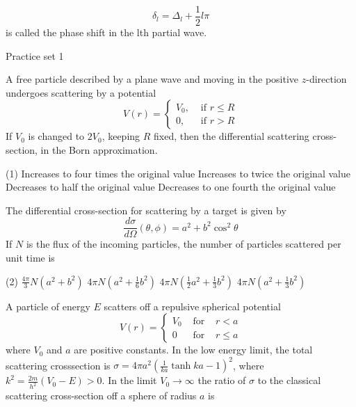  $$
 \delta_{l}=\Delta_{l}+\frac{1}{2} l \pi
 $$
 is called the phase shift in the lth partial wave.
 \newpage
 \begin{abox}
 	Practice set 1
 	\end{abox}
 \begin{enumerate}
 	\begin{minipage}{\textwidth}
 	\item A free particle described by a plane wave and moving in the positive $z$-direction undergoes scattering by a potential
 	$$
 	V(r)= \begin{cases}V_{0}, & \text { if } r \leq R \\ 0, & \text { if } r>R\end{cases}
 	$$
 	If $V_{0}$ is changed to $2 V_{0}$, keeping $R$ fixed, then the differential scattering cross-section, in the Born approximation.
 \end{minipage}
 \begin{tasks}(1)
 	\task[\textbf{A.}]Increases to four times the original value
 	\task[\textbf{B.}]Increases to twice the original value
 	\task[\textbf{C.}]Decreases to half the original value
 	\task[\textbf{D.}]Decreases to one fourth the original value
 \end{tasks}
\begin{minipage}{\textwidth}
	\item The differential cross-section for scattering by a target is given by
	$$
	\frac{d \sigma}{d \Omega}(\theta, \phi)=a^{2}+b^{2} \cos ^{2} \theta
	$$
	If $N$ is the flux of the incoming particles, the number of particles scattered per unit time is
\end{minipage}
\begin{tasks}(2)
	\task[\textbf{A.}] $\frac{4 \pi}{3} N\left(a^{2}+b^{2}\right)$
	\task[\textbf{B.}]$4 \pi N\left(a^{2}+\frac{1}{6} b^{2}\right)$
	\task[\textbf{C.}]$4 \pi N\left(\frac{1}{2} a^{2}+\frac{1}{3} b^{2}\right)$
	\task[\textbf{D.}]$4 \pi N\left(a^{2}+\frac{1}{3} b^{2}\right)$
\end{tasks}
\begin{minipage}{\textwidth}
	\item A particle of energy $E$ scatters off a repulsive spherical potential
	$$
	V(r)=\left\{\begin{array}{ccc}
	V_{0} & \text { for } & r<a \\
	0 & \text { for } & r \leq a
	\end{array}\right.
	$$
	where $V_{0}$ and $a$ are positive constants. In the low energy limit, the total scattering crosssection is $\sigma=4 \pi a^{2}\left(\frac{1}{k a} \tanh k a-1\right)^{2}$, where $k^{2}=\frac{2 m}{h^{2}}\left(V_{0}-E\right)>0$. In the limit $V_{0} \rightarrow \infty$ the ratio of $\sigma$ to the classical scattering cross-section off a sphere of radius $a$ is

\end{minipage}
\end{enumerate}
